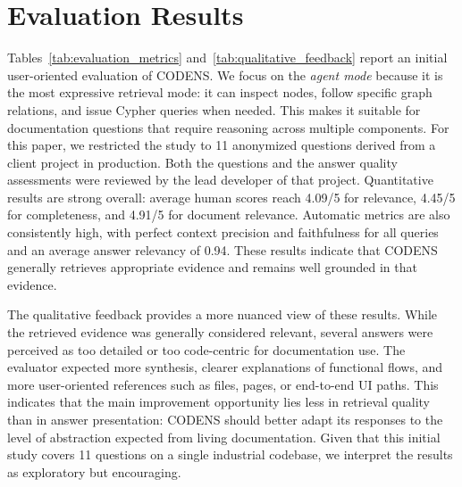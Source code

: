 \documentclass[sigconf]{acmart}
\begin{document}
\section{Evaluation Results}

Tables~\ref{tab:evaluation_metrics} and~\ref{tab:qualitative_feedback} report an initial user-oriented evaluation of CODENS.
We focus on the \emph{agent mode} because it is the most expressive retrieval mode: it can inspect nodes, follow specific graph relations, and issue Cypher queries when needed.
This makes it suitable for documentation questions that require reasoning across multiple components. For this paper, we restricted the study to 11 anonymized questions derived from a client project in production. Both the questions and the answer quality assessments were reviewed by the lead developer of that project. Quantitative results are strong overall: average human scores reach 4.09/5 for relevance, 4.45/5 for completeness, and 4.91/5 for document relevance. Automatic metrics are also consistently high, with perfect context precision and faithfulness for all queries and an average answer relevancy of 0.94. These results indicate that CODENS generally retrieves appropriate evidence and remains well grounded in that evidence.

The qualitative feedback provides a more nuanced view of these results. While the retrieved evidence was generally considered relevant, several answers were perceived as too detailed or too code-centric for documentation use. The evaluator expected more synthesis, clearer explanations of functional flows, and more user-oriented references such as files, pages, or end-to-end UI paths. This indicates that the main improvement opportunity lies less in retrieval quality than in answer presentation: CODENS should better adapt its responses to the level of abstraction expected from living documentation. Given that this initial study covers 11 questions on a single industrial codebase, we interpret the results as exploratory but encouraging.
\end{document}
